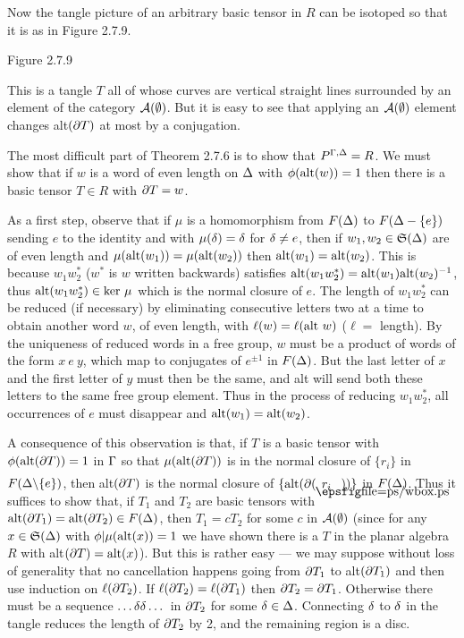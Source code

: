 Now the tangle picture of an arbitrary basic tensor in $R$ can be
isotoped so that it is as in Figure 2.7.9.
\[
        
\]
\begin{center}
        Figure 2.7.9
\end{center}

\noindent This is a tangle $T$ all of whose curves are vertical
straight lines surrounded by an element of the category ${\cal A} (\emptyset)$. But it
is easy to see that applying an ${\cal A} (\emptyset)$ element changes alt$(\partial T)$ at
most by a conjugation.

The most difficult part of Theorem 2.7.6 is to show that
$P^{\Gamma,\Delta}=R$. We must show that if $w$ is a word of even length on
$\Delta$ with $\phi({\bf\rm{alt}}(w))=1$ then there is a basic tensor
$T\in R$ with $\partial T=w$.

As a first step, observe that if $\mu$ is a homomorphism from
$F(\Delta)$ to $F(\Delta-\{e\})$ sending $e$ to the identity and with
$\mu(\delta)=\delta$ for $\delta\neq e$, then if $w_1,w_2\in\frak S(\Delta)$ are of
even length and $\mu({\bf\rm{alt}}(w_1))=\mu({\bf\rm{alt}}(w_2))$ then
${\bf\rm{alt}}(w_1)={\bf\rm{alt}}(w_2)$. This is because
$w_1w^*_2$ ($w^*$ is $w$ written backwards) satisfies
${\bf\rm{alt}}(w_1w^*_2)={\bf\rm{alt}}(w_1){\bf\rm{alt}}(w_2)^{-1}$, thus
${\op{alt}}(w_1w_2^*)\in{\op{ker}} \ \mu$ which is the normal
closure of $e$. The length of $w_1w_2^*$ can be reduced
(if necessary) by eliminating consecutive letters two at a time to
obtain another word $w$, of even length, with
$\ell(w)=\ell({\bf\rm{alt}} \ w)$ ($\ell=$ length). By the uniqueness
of reduced words in a free group, $w$ must be a product of words of
the form $x \ e \ y$, which map to conjugates of
$e^{\pm 1}$ in $F(\Delta)$. But the last letter of $x$ and the first
letter of $y$ must then be the same, and alt will send both these
letters to the same free group element. Thus in the process of
reducing $w_1w^*_2$, all occurrences of $e$ must disappear and
${\bf\rm{alt}}(w_1)={\bf\rm{alt}}(w_2)$.

A consequence of this observation is that, if $T$ is a basic tensor
with $\phi({\bf\rm{alt}}(\partial T))=1$ in $\Gamma$ so that
$\mu({\bf\rm{alt}}(\partial T))$ is in the normal closure of $\{r_i\}$ in
$F(\Delta\backslash\{e\})$, then alt$(\partial T)$ is the normal closure of
$\{{\op{alt}}(\p( \blankbox{r_i}))\}$ in $F(\Delta)$. Thus it
suffices to show that, if $T_1$ and $T_2$ are basic tensors with
${\bf\rm{alt}}(\partial T_1)={\bf\rm{alt}}(\partial T_2)\in F(\Delta)$, then $T_1=cT_2$
for some $c$ in ${\cal A} (\emptyset)$ (since for any $x\in\frak
S(\Delta)$ with $\phi |\mu({\bf\rm{alt}}(x))=1$ we have shown there is a
$T$ in the planar algebra $R$ with alt$(\partial T)={\bf\rm{alt}}(x)$).
But this is rather easy --- we may suppose without loss of
generality that no cancellation happens going from $\partial T_1$ to
alt$(\partial T_1)$ and then use induction on $\ell(\partial T_2)$. If
$\ell(\partial T_2)=\ell(\partial T_1)$ then $\partial T_2=\partial T_1$. Otherwise there
must be a sequence $\dots \delta\delta\dots$ in $\partial T_2$ for some
$\delta\in\Delta$. Connecting $\delta$ to $\delta$ in the tangle reduces the length
of $\partial T_2$ by 2, and the remaining region is a disc.

